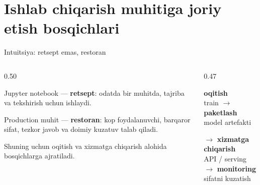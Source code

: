 \documentclass[aspectratio=169,11pt]{beamer}
\newcommand{\uzq}{\textquotesingle{}}   %
\begin{document}
\section[Deploy]{Ishlab chiqarish muhitiga joriy etish bosqichlari}

\begin{frame}{Intuitsiya: retsept emas, restoran}
  \small

  \begin{columns}[T,totalwidth=\textwidth]
    \begin{column}{0.50\textwidth}
      \begin{tcolorbox}[warnbox,title={Notebook prototipi},top=2pt,bottom=2pt]
        \footnotesize
        Jupyter notebook --- \textbf{retsept}: odatda bir muhitda,
        tajriba va tekshirish uchun ishlaydi.
      \end{tcolorbox}

      \vspace{4pt}

      \begin{tcolorbox}[okbox,title={Ishlab chiqarish xizmati},top=2pt,bottom=2pt]
        \footnotesize
        Production muhit --- \textbf{restoran}: ko\uzq{}p foydalanuvchi,
        barqaror sifat, tezkor javob va doimiy kuzatuv talab qiladi.
      \end{tcolorbox}

      \vspace{3pt}
      {\footnotesize
      Shuning uchun o\uzq{}qitish va xizmatga chiqarish alohida bosqichlarga ajratiladi.
      }
    \end{column}

    \begin{column}{0.47\textwidth}
      \begin{tcolorbox}[defbox,title={Yo\uzq{}l xaritasi},top=2pt,bottom=2pt]
        \centering
        \scriptsize
        \textbf{o\uzq{}qitish}\\
        {\tiny train}
        \quad$\longrightarrow$\quad
        \textbf{paketlash}\\
        {\tiny model artefakti}

        \vspace{4pt}

        $\longrightarrow$\quad
        \textbf{xizmatga chiqarish}\\
        {\tiny API / serving}
        \quad$\longrightarrow$\quad
        \textbf{monitoring}\\
        {\tiny sifatni kuzatish}
      \end{tcolorbox}


\end{column}
\end{columns}
\end{frame}
\end{document}
